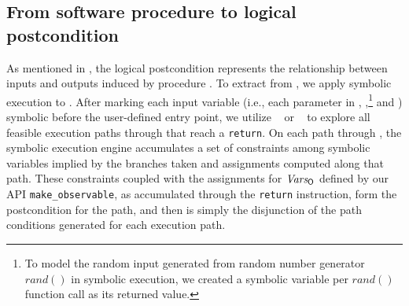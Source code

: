 \iffalse
\begin{figure*}[t!]
\begin{subfigure}[b]{0.25\textwidth}
  \centering
	\resizebox{0.55\linewidth}{!}{\footnotesize}
  \caption{Procedure}
  \label{fig:mergingbenefit:proc}
\end{subfigure}
\begin{subfigure}[b]{0.37\textwidth}
  \centering
  \resizebox{0.92\linewidth}{!}{\scriptsize}
  \caption{Path exploration without merging}
  \label{fig:mergingbenefit:nomerge}
\end{subfigure}
\begin{subfigure}[b]{0.37\textwidth}
  \centering
  \resizebox{0.8\linewidth}{!}{\scriptsize}
  \caption{Path exploration with merging}
  \label{fig:mergingbenefit:merge}
\end{subfigure}
\caption{Benefits from state merging, discussed in \appref{sscf:sec:symbolic}}
\label{fig:mergingbenefit}
\end{figure*}
\fi

\subsection{From software procedure to logical postcondition}
\label{sscf:sec:symbolic}

As mentioned in , the logical postcondition
\postcondition{\proc}{} represents the relationship between inputs and
outputs induced by procedure \proc. To extract \postcondition{\proc}{}
from \proc, we apply symbolic execution to \proc.  After marking each
input variable (i.e., each parameter in \ACIKeys, \AIIKeys,\footnote{To
  model the random input generated from random number generator
  $\mathit{rand}()$ in symbolic execution, we created a symbolic
  variable per $\mathit{rand}()$ function call as its returned
  value.} and \SecKeys) symbolic before the user-defined entry point,
we utilize \klee~\cite{cadar08:klee} or \stwoe~\cite{chipounov11:s2e}
to explore all feasible execution paths through \proc that reach a
\texttt{return}.  On each path through \proc, the symbolic execution
engine accumulates a set of constraints among symbolic variables
implied by the branches taken and assignments computed along that
path.  These constraints coupled with the assignments for $\mathit{Vars_{\mathsf{O}_{}}}$ defined by our API \texttt{make\_observable}, as accumulated through the \texttt{return}
instruction, form the postcondition for the path, and then
\postcondition{\proc}{} is simply the disjunction of the path
conditions generated for each execution path. 

